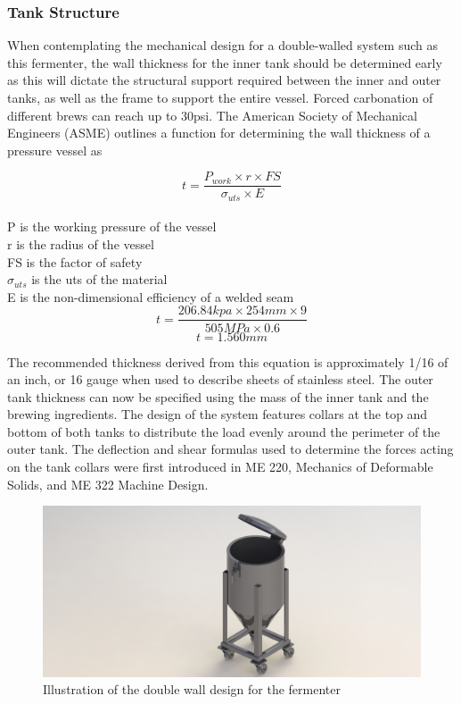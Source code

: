 \documentclass{article}
\begin{document}
\subsubsection{Tank Structure}
When contemplating the mechanical design for a double-walled system such as this fermenter, the wall thickness for the inner tank should be determined early as this will dictate the structural support required between the inner and outer tanks, as well as the frame to support the entire vessel. Forced carbonation of different brews can reach up to 30psi.  The American Society of Mechanical Engineers (ASME) outlines a function for determining the wall thickness of a pressure vessel as

\begin{equation}
t = \frac{P_{work} \times r \times FS}{\sigma_{uts} \times E}
\end{equation}
 \\
P is the working pressure of the vessel\\
r is the radius of the vessel\\
FS is the factor of safety\\
$­\sigma_{uts}$ is the \gls{uts} of the material\\
E is the non-dimensional efficiency of a welded seam\\

\begin{equation}
t = \frac{206.84kpa \times 254mm \times 9}{505MPa \times 0.6}
\end{equation}
\begin{equation}
t = 1.560mm
\end{equation}

The recommended thickness derived from this equation is approximately 1/16 of an inch, or 16 gauge when used to describe sheets of stainless steel.
The outer tank thickness can now be specified using the mass of the inner tank and the brewing ingredients.  The design of the system features collars at the top and bottom of both tanks to distribute the load evenly around the perimeter of the outer tank.  The deflection and shear formulas used to determine the forces acting on the tank collars were first introduced in ME 220, Mechanics of Deformable Solids, and ME 322 Machine Design.

\begin{figure}[H]
\begin{center}
\includegraphics[scale=0.20]{fermenter-cad.png}
\caption{Illustration of the double wall design for the fermenter}
\label{fig:fermenter-cad}
\end{center}
\end{figure}
\end{document}
